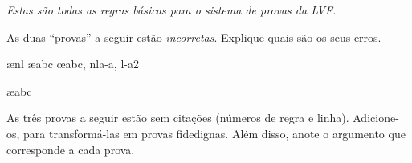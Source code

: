 \emph{Estas são todas as regras básicas para o sistema de provas da LVF.}


\practiceproblems

\problempart
As duas ``provas'' a seguir estão  \emph{incorretas}. Explique quais são os seus erros.
\begin{fitchproof}
\open
{}
\ae{nl}
	\ae{abc}
\close
\open
\close
{}\oe{abc, nla-a, l-a2}
\end{fitchproof}

\begin{fitchproof}
\ae{abc}
\end{fitchproof}

\problempart
As três provas a seguir estão sem citações (números de regra e linha). Adicione-os, para transformá-las  em provas fidedignas.  Além disso, anote o argumento que corresponde a cada prova.
\begin{multicols}{2}
\begin{fitchproof}
\end{fitchproof}

\begin{fitchproof}
\open
\close
{}%
\end{fitchproof}

\begin{fitchproof}
\open
\close
\open
\close
{}%
\end{fitchproof}
\end{multicols}

